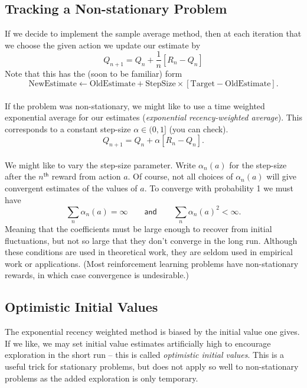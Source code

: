 \documentclass[a4paper, oneside, 11pt]{article}
\begin{document}
\subsection{Tracking a Non-stationary Problem}
If we decide to implement the sample average method, then at each iteration that we choose the given action we update our estimate by
\begin{equation}
    Q_{n+1} = Q_n + \frac1n [R_n - Q_n]
\end{equation}
Note that this has the (soon to be familiar) form
\begin{equation}
    \mathrm{NewEstimate} \gets \mathrm{OldEstimate} + \mathrm{StepSize}\times[\mathrm{Target} - \mathrm{OldEstimate}].
\end{equation}
\mbox{}\\
If the problem was non-stationary, we might like to use a time weighted exponential average for our estimates (\emph{exponential recency-weighted average}). This corresponds to a constant step-size $\alpha \in (0, 1]$ (you can check).
\begin{equation}
    Q_{n+1} = Q_n + \alpha [R_n - Q_n].
\end{equation}
\mbox{}\\
We might like to vary the step-size parameter. Write $\alpha_n(a)$ for the step-size after the $n^{\mathsf{th}}$ reward from action $a$. Of course, not all choices of $\alpha_n(a)$ will give convergent estimates of the values of $a$. To converge with probability 1 we must have
\begin{equation}
    \sum_n \alpha_n(a) = \infty \quad\quad \mathsf{and} \quad\quad  \sum_n \alpha_n(a)^2 < \infty.
\end{equation}
Meaning that the coefficients must be large enough to recover from initial fluctuations, but not so large that they don't converge in the long run. Although these conditions are used in theoretical work, they are seldom used in empirical work or applications. (Most reinforcement learning problems have non-stationary rewards, in which case convergence is undesirable.)

\subsection{Optimistic Initial Values}
The exponential recency weighted method is biased by the initial value one gives. If we like, we may set initial value estimates artificially high to encourage exploration in the short run -- this is called \emph{optimistic initial values}. This is a useful trick for stationary problems, but does not apply so well to non-stationary problems as the added exploration is only temporary.
\end{document}
